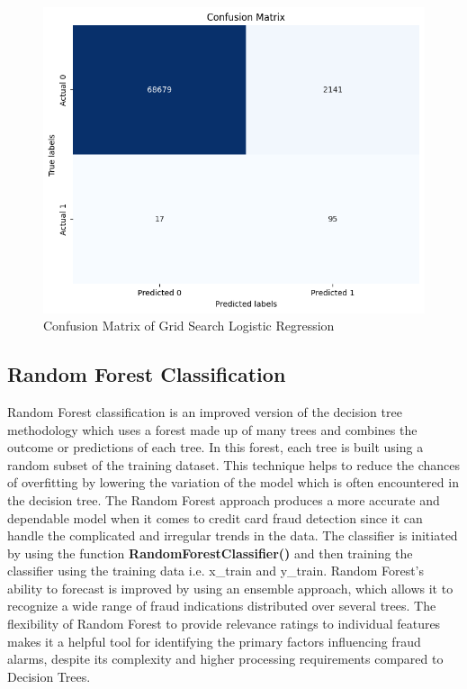 \begin{figure}[ht]
    \centering
    \includegraphics[scale=0.9]{figures/CM_GridSearch.png}
    \caption{Confusion Matrix of Grid Search Logistic Regression}
    \label{fig:Plot of the Data}
\end{figure}

\clearpage


\subsection{Random Forest Classification}

Random Forest classification is an improved version of the decision tree methodology which uses a forest made up of many trees and combines the outcome or predictions of each tree. In this forest, each tree is built using a random subset of the training dataset. This technique helps to reduce the chances of overfitting by lowering the variation of the model which is often encountered in the decision tree. The Random Forest approach produces a more accurate and dependable model when it comes to credit card fraud detection since it can handle the complicated and irregular trends in the data. The classifier is initiated by using the function \textbf{RandomForestClassifier() }and then training the classifier using the training data i.e. x\_train and y\_train. Random Forest’s ability to forecast is improved by using an ensemble approach, which allows it to recognize a wide range of fraud indications distributed over several trees. The flexibility of Random Forest to provide relevance ratings to individual features makes it a helpful  tool for identifying the primary factors influencing fraud alarms, despite its complexity and higher processing requirements compared to Decision Trees.

